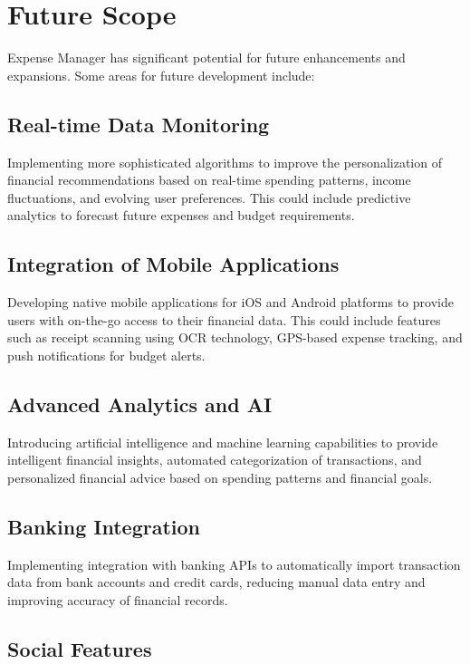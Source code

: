 \chapter{Future Scope}

Expense Manager has significant potential for future enhancements and expansions. Some areas for future development include:

\section{Real-time Data Monitoring}

Implementing more sophisticated algorithms to improve the personalization of financial recommendations based on real-time spending patterns, income fluctuations, and evolving user preferences. This could include predictive analytics to forecast future expenses and budget requirements.

\section{Integration of Mobile Applications}

Developing native mobile applications for iOS and Android platforms to provide users with on-the-go access to their financial data. This could include features such as receipt scanning using OCR technology, GPS-based expense tracking, and push notifications for budget alerts.

\section{Advanced Analytics and AI}

Introducing artificial intelligence and machine learning capabilities to provide intelligent financial insights, automated categorization of transactions, and personalized financial advice based on spending patterns and financial goals.

\section{Banking Integration}

Implementing integration with banking APIs to automatically import transaction data from bank accounts and credit cards, reducing manual data entry and improving accuracy of financial records.

\section{Social Features}

